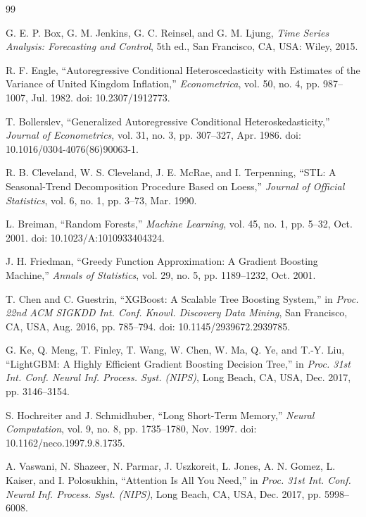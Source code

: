 \documentclass[12pt,a4paper]{report}
\theoremstyle{definition}
\theoremstyle{remark}
\begin{document}
\cleardoublepage
{}
\begin{thebibliography}{99}

G. E. P. Box, G. M. Jenkins, G. C. Reinsel, and G. M. Ljung,
{\em Time Series Analysis: Forecasting and Control}, 5th ed.,
San Francisco, CA, USA: Wiley, 2015.

R. F. Engle,
``Autoregressive Conditional Heteroscedasticity with Estimates of the Variance of United Kingdom Inflation,''
{\em Econometrica}, vol. 50, no. 4, pp. 987--1007, Jul. 1982. doi: 10.2307/1912773.

T. Bollerslev,
``Generalized Autoregressive Conditional Heteroskedasticity,''
{\em Journal of Econometrics}, vol. 31, no. 3, pp. 307--327, Apr. 1986. doi: 10.1016/0304-4076(86)90063-1.

R. B. Cleveland, W. S. Cleveland, J. E. McRae, and I. Terpenning,
``STL: A Seasonal-Trend Decomposition Procedure Based on Loess,''
{\em Journal of Official Statistics}, vol. 6, no. 1, pp. 3--73, Mar. 1990.

L. Breiman,
``Random Forests,''
{\em Machine Learning}, vol. 45, no. 1, pp. 5--32, Oct. 2001. doi: 10.1023/A:1010933404324.

J. H. Friedman,
``Greedy Function Approximation: A Gradient Boosting Machine,''
{\em Annals of Statistics}, vol. 29, no. 5, pp. 1189--1232, Oct. 2001.

T. Chen and C. Guestrin,
``XGBoost: A Scalable Tree Boosting System,''
in {\em Proc. 22nd ACM SIGKDD Int. Conf. Knowl. Discovery Data Mining}, San Francisco, CA, USA, Aug. 2016, pp. 785--794. doi: 10.1145/2939672.2939785.

G. Ke, Q. Meng, T. Finley, T. Wang, W. Chen, W. Ma, Q. Ye, and T.-Y. Liu,
``LightGBM: A Highly Efficient Gradient Boosting Decision Tree,''
in {\em Proc. 31st Int. Conf. Neural Inf. Process. Syst. (NIPS)}, Long Beach, CA, USA, Dec. 2017, pp. 3146--3154.

S. Hochreiter and J. Schmidhuber,
``Long Short-Term Memory,''
{\em Neural Computation}, vol. 9, no. 8, pp. 1735--1780, Nov. 1997. doi: 10.1162/neco.1997.9.8.1735.

A. Vaswani, N. Shazeer, N. Parmar, J. Uszkoreit, L. Jones, A. N. Gomez, L. Kaiser, and I. Polosukhin,
``Attention Is All You Need,''
in {\em Proc. 31st Int. Conf. Neural Inf. Process. Syst. (NIPS)}, Long Beach, CA, USA, Dec. 2017, pp. 5998--6008.


\end{thebibliography}
\end{document}
